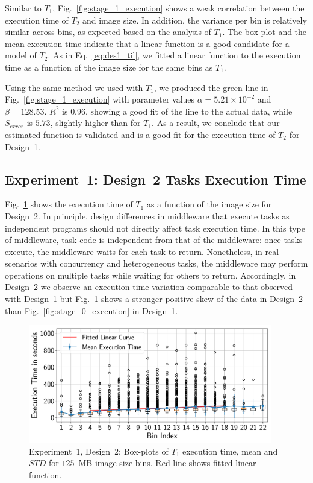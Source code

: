 Similar to $T_{1}$, Fig.~\ref{fig:stage_1_execution} shows a weak correlation
between the execution time of $T_{2}$ and image size. In addition, the
variance per bin is relatively similar across bins, as expected based on the
analysis of $T_{1}$. The box-plot and the mean execution time indicate that a
linear function is a good candidate for a model of $T_{2}$. As in
Eq.~\ref{eq:des1_til}, we fitted a linear function to the execution time as a
function of the image size for the same bins as $T_{1}$.

Using the same method we used with $T_{1}$, we produced the green line in
Fig.~\ref{fig:stage_1_execution} with parameter values $\alpha = 5.21
\times 10^{-2}$ and $\beta = 128.53$. $R^{2}$ is $0.96$, showing a good fit
of the line to the actual data, while $S_{error}$ is $5.73$, slightly higher
than for $T_{1}$. As a result, we conclude that our estimated function is
validated and is a good fit for the execution time of $T_{2}$ for Design~1.

\subsection{Experiment~1: Design~2 Tasks Execution Time}

Fig.~\ref{fig:stage_1_execution_des2} shows the execution time of $T_{1}$ as
a function of the image size for Design~2. In principle, design differences
in middleware that execute tasks as independent programs should not directly
affect task execution time. In this type of middleware, task code is
independent from that of the middleware: once tasks execute, the middleware
waits for each task to return. Nonetheless, in real scenarios with
concurrency and heterogeneous tasks, the middleware may perform operations on
multiple tasks while waiting for others to return. Accordingly, in Design~2
we observe an execution time variation comparable to that observed with
Design~1 but Fig.~\ref{fig:stage_1_execution_des2} shows a stronger positive
skew of the data in Design~2 than Fig.~\ref{fig:stage_0_execution} in
Design~1.

\begin{figure}[ht!]
	\centering
	\includegraphics[width=0.95\textwidth]{figures/designs/stage_0_tx_box_des2.pdf}
	\caption{Experiment~1, Design~2: Box-plots of $T_{1}$ execution time,
		mean and $STD$ for $125$~MB image size bins. Red line shows fitted linear
		function.}\label{fig:stage_1_execution_des2}
\end{figure}


